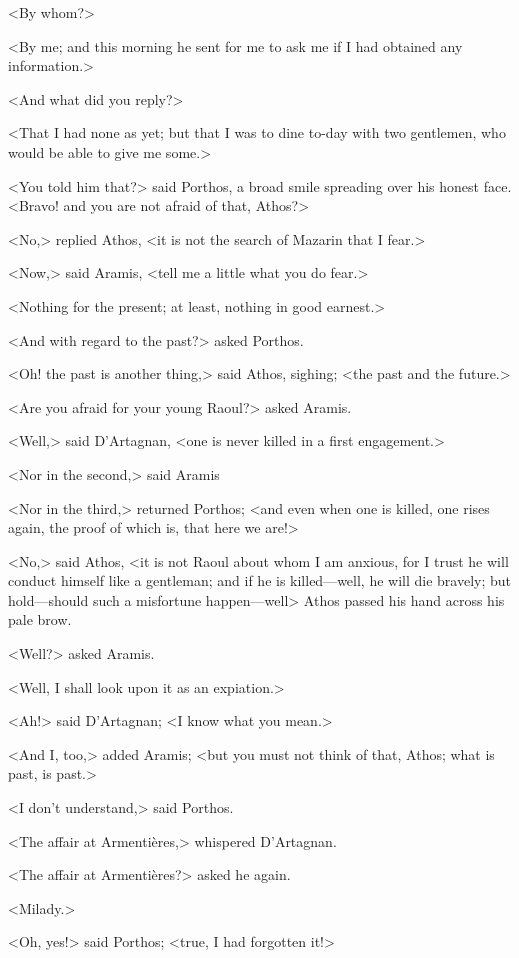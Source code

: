 <By whom?>

<By me; and this morning he sent for me to ask me if I had obtained any information.>

<And what did you reply?>

<That I had none as yet; but that I was to dine to-day with two gentlemen, who would be able to give me some.>

<You told him that?> said Porthos, a broad smile spreading over his honest face. <Bravo! and you are not afraid of that, Athos?>

<No,> replied Athos, <it is not the search of Mazarin that I fear.>

<Now,> said Aramis, <tell me a little what you do fear.>

<Nothing for the present; at least, nothing in good earnest.>

<And with regard to the past?> asked Porthos.

<Oh! the past is another thing,> said Athos, sighing; <the past and the future.>

<Are you afraid for your young Raoul?> asked Aramis.

<Well,> said D'Artagnan, <one is never killed in a first engagement.>

<Nor in the second,> said Aramis

<Nor in the third,> returned Porthos; <and even when one is killed, one rises again, the proof of which is, that here we are!>

<No,> said Athos, <it is not Raoul about whom I am anxious, for I trust he will conduct himself like a gentleman; and if he is killed—well, he will die bravely; but hold—should such a misfortune happen—well\longdash> Athos passed his hand across his pale brow.

<Well?> asked Aramis.

<Well, I shall look upon it as an expiation.>

<Ah!> said D'Artagnan; <I know what you mean.>

<And I, too,> added Aramis; <but you must not think of that, Athos; what is past, is past.>

<I don't understand,> said Porthos.

<The affair at Armentières,> whispered D'Artagnan.

<The affair at Armentières?> asked he again.

<Milady.>

<Oh, yes!> said Porthos; <true, I had forgotten it!>

